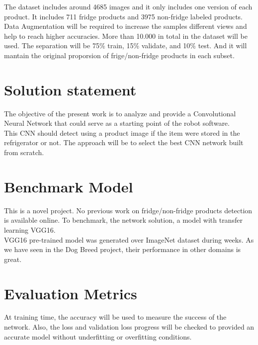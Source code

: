 \documentclass[a4paper,10pt]{article}
\begin{document}
The dataset includes around 4685 images and it only includes one version of each product. It includes 711 fridge products and 3975 non-fridge labeled products. \\

Data Augmentation will be required to increase the samples different views and help to reach higher accuracies. More than 10.000 in total in the dataset will be used. The separation will be 75\% train, 15\% validate, and 10\% test. And it will mantain the original proporsion of frige/non-fridge products in each subset.\\

\section{Solution statement}

The objective of the present work is to analyze and provide a Convolutional Neural Network that could serve as a starting point of the robot software.\\

This CNN should detect using a product image if the item were stored in the refrigerator or not. The approach will be to select the best CNN network built from scratch.\\

\section{Benchmark Model}

This is a novel project. No previous work on fridge/non-fridge products detection is available online. To benchmark, the network solution, a model with transfer learning VGG16\cite{vgg16}. \\

VGG16\cite{vgg16} pre-trained model was generated over ImageNet dataset during weeks. As we have seen in the Dog Breed project, their performance in other domains is great. \\

\section{Evaluation Metrics}

At training time, the accuracy will be used to measure the success of the network. Also, the loss and validation loss progress will be checked to provided an accurate model without underfitting or overfitting conditions.\\
\end{document}

